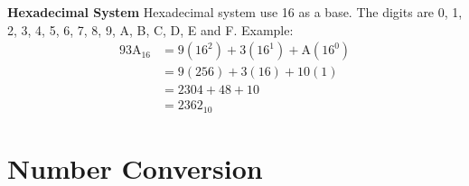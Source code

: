 \noindent\large\textbf{Hexadecimal System}\newline
\normalsize Hexadecimal system use 16 as a base. The digits are 0, 1, 2, 3, 4, 5, 6, 7, 8, 9, A, B, C, D, E and F. Example:
\begin{equation} \label{eq4}
\begin{split}
93\text{A}_{16} & = 9(16^2)+3(16^1)+\text{A}(16^0) \\
& = 9(256)+3(16)+10(1) \\
& = 2304+48+10 \\
& = 2362_{10}
\end{split}
\end{equation} 

\section{Number Conversion}
